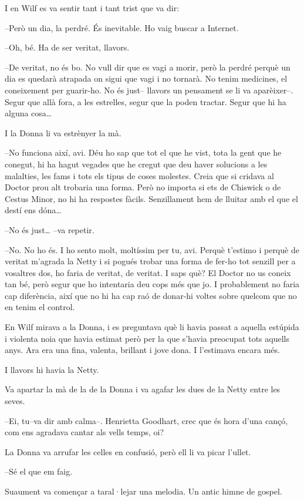 I en Wilf es va sentir tant i tant trist que va dir:

--Però un dia, la perdré. És inevitable. Ho vaig buscar a Internet.

--Oh, bé. Ha de ser veritat, llavors.

--De veritat, no és bo. No vull dir que es vagi a morir, però la perdré
perquè un dia es quedarà atrapada on sigui que vagi i no tornarà. No
tenim medicines, el coneixement per guarir-ho. No és just-- llavors un
pensament se li va aparèixer--. Segur que allà fora, a les estrelles,
segur que la poden tractar. Segur que hi ha alguna cosa\ldots{}

I la Donna li va estrènyer la mà.

--No funciona així, avi. Déu ho sap que tot el que he vist, tota la gent
que he conegut, hi ha hagut vegades que he cregut que deu haver
solucions a les malalties, les fams i tots els tipus de coses molestes.
Creia que si cridava al Doctor prou alt trobaria una forma. Però no
importa si ets de Chiswick o de Cestus Minor, no hi ha respostes fàcils.
Senzillament hem de lluitar amb el que el destí ens dóna\ldots{}

--No és just\ldots{} --va repetir.

--No. No ho és. I ho sento molt, moltíssim per tu, avi. Perquè t'estimo
i perquè de veritat m'agrada la Netty i si pogués trobar una forma de
fer-ho tot senzill per a vosaltres dos, ho faria de veritat, de veritat.
I saps què? El Doctor no us coneix tan bé, però segur que ho intentaria
deu cops més que jo. I probablement no faria cap diferència, així que no
hi ha cap raó de donar-hi voltes sobre quelcom que no en tenim el
control.

En Wilf mirava a la Donna, i es preguntava què li havia passat a aquella
estúpida i violenta noia que havia estimat però per la que s'havia
preocupat tots aquells anys. Ara era una fina, valenta, brillant i jove
dona. I l'estimava encara més.

I llavors hi havia la Netty.

Va apartar la mà de la de la Donna i va agafar les dues de la Netty
entre les seves.

--Ei, tu--va dir amb calma--. Henrietta Goodhart, crec que és hora d'una
cançó, com ens agradava cantar als vells temps, oi?

La Donna va arrufar les celles en confusió, però ell li va picar
l'ullet.

--Sé el que em faig.

Suaument va començar a taral·lejar una melodia. Un antic himne de
gospel.

